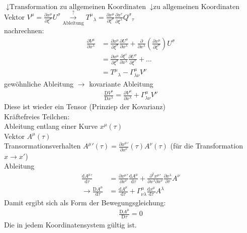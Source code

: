 \documentclass[a4paper]{article}
\begin{document}
$\downarrow \text{Transformation zu allgemeinen
Koordinaten}$$\downarrow\text{zu allgemeinen Koordinaten}$\\
Vektor $V^\mu=\frac{\partial x^\mu}{\partial \xi^\sigma}
U^\sigma\overset{?}{\underset{\text{Ableitung}}{\longrightarrow}}T^\mu{}_\lambda=
\frac{\partial x^\mu}{\partial \xi^\sigma}\frac{\partial x^\tau}{\partial
\xi^\lambda} Q^\sigma{}_\tau$\\
nachrechnen:
\begin{align}
\frac{\partial V^\mu}{\partial x^\lambda}&=\frac{\partial x^\mu}{\partial
\xi^\sigma}\frac{\partial U^\sigma}{\partial x^\lambda} +
\frac{\partial}{\partial x^\lambda} \left( \frac{\partial x^\mu}{\partial
\xi^\sigma} \right) U^\sigma\\
&=\frac{\partial x^\mu}{\partial \xi^\sigma}\frac{\partial
\xi^\tau}{\partial x^\lambda}\frac{\partial U^\sigma}{\partial
\xi^\tau}+\ldots\\
&=T^\mu{}_\lambda-\Gamma^\mu_{\lambda\nu}V^\nu
\end{align}
gewöhnliche Ableitung $\rightarrow$ kovariante Ableitung\\
\begin{align}
\frac{\mathrm{D}V^\mu}{\mathrm{D}x^\lambda}=\frac{\partial V^\mu}{\partial
x^\lambda}+ \Gamma^\mu_{\lambda\nu}V^\nu
\end{align}
Diese ist wieder ein Tensor (Prinziep der Kovarianz)\\
Kräftefreies Teilchen:\\
Ableitung entlang einer Kurve $x^\mu(\tau)$\\
Vektor $A^\mu(\tau)$\\
Transormationsverhalten $A^\mu{}'(\tau)=\frac{\partial x^\mu{}'}{\partial
x^\nu}(\tau) A^\nu(\tau)$ (für die Transformation $x\rightarrow x'$)\\
Ableitung 
\begin{align}
\frac{\mathrm{d} A^\mu{}'}{\mathrm{d}\tau}&=\frac{\partial
x^\mu{}'}{\partial x^\nu} \frac{\mathrm{d} A^\mu}{\mathrm{d}\tau}+
\frac{\partial^2 x^\mu{}'}{\partial x^\lambda \partial x^\nu} \frac{\partial
x^\lambda}{\partial \tau}A^\nu\\
\rightarrow \frac{\mathrm{D} A^\mu}{\mathrm{d}\tau}&=\frac{\mathrm{d}
A^\mu}{\mathrm{d}\tau}+\Gamma^\mu_{\nu\lambda}\frac{\mathrm{d}
x^\mu}{\mathrm{d}\tau}A^\lambda
\end{align}
Damit ergibt sich als Form der Bewegungsgleichung:
\begin{align}
\frac{\mathrm{D}A^\mu}{\mathrm{D}\tau}=0
\end{align}
Die in jedem Koordinatensystem gültig ist.
\end{document}
